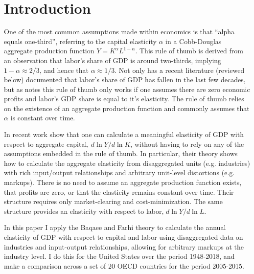 \documentclass[11pt]{article}
\begin{document}
\section{Introduction}
\onehalfspacing One of the most common assumptions made within economics is that ``alpha equals one-third'', referring to the capital elasticity $\alpha$ in a Cobb-Douglas aggregate production function $Y = K^{\alpha}L^{1-\alpha}$. This rule of thumb is derived from an observation that labor's share of GDP is around two-thirds, implying $1-\alpha \approx 2/3$, and hence that $\alpha \approx 1/3$. Not only has a recent literature (reviewed below) documented that labor's share of GDP has fallen in the last few decades, but as \cite{hall1988,hall1990} notes this rule of thumb only works if one assumes there are zero economic profits and labor's GDP share is equal to it's elasticity. The rule of thumb relies on the existence of an aggregate production function and commonly assumes that $\alpha$ is constant over time.

In recent work \cite{bfshortnote,bfprodge} show that one can calculate a meaningful elasticity of GDP with respect to aggregate capital, $d \ln Y/ d \ln K$, without having to rely on any of the assumptions embedded in the rule of thumb. In particular, their theory shows how to calculate the aggregate elasticity from disaggregated units (e.g. industries) with rich input/output relationships and arbitrary unit-level distortions (e.g. markups). There is no need to assume an aggregate production function exists, that profits are zero, or that the elasticity remains constant over time. Their structure requires only market-clearing and cost-minimization. The same structure provides an elasticity with respect to labor, $d \ln Y/ d \ln L$.

In this paper I apply the Baqaee and Farhi theory to calculate the annual elasticity of GDP with respect to capital and labor using disaggregated data on industries and input-output relationships, allowing for arbitrary markups at the industry level. I do this for the United States over the period 1948-2018, and make a comparison across a set of 20 OECD countries for the period 2005-2015. 
\end{document}
